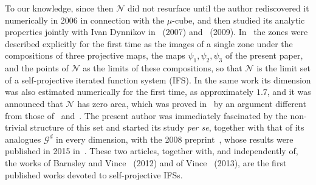 \documentclass[11pt]{amsart}
\theoremstyle{definition}
\theoremstyle{remark}
\newcommand{\cN}{\mathcal N}
\begin{document}
To our knowledge, since then $\cN$ did not resurface until the author rediscovered it numerically in 2006 in connection with the $\mu$-cube, and then studied its analytic properties jointly with Ivan Dynnikov in~\cite{DD07} (2007) and~\cite{DD09} (2009).
In~\cite{DD07} the zones were described explicitly for the first time as the images of a single zone under the compositions of three projective maps, the maps $\psi_1,\psi_2,\psi_3$ of the present paper, and the points of $\cN$ as the limits of these compositions, so that $\cN$ is the limit set of a self-projective iterated function system (IFS).
In the same work its dimension was also estimated numerically for the first time, as approximately $1.7$, and it was announced that $\cN$ has zero area, which was proved in~\cite{DD09} by an argument different from those of~\cite{MN89} and~\cite{Lev93}.
The present author was immediately fascinated by the non-trivial structure of this set and started its study \emph{per se}, together with that of its analogues $\mathcal G^d$ in every dimension, with the 2008 preprint~\cite{DL08}, whose results were published in 2015 in~\cite{DL15EM,DL15JGA}.
These two articles, together with, and independently of, the works of Barnsley and Vince~\cite{BV12} (2012) and of Vince~\cite{Vin13} (2013), are the first published works devoted to self-projective IFSs.
\end{document}
